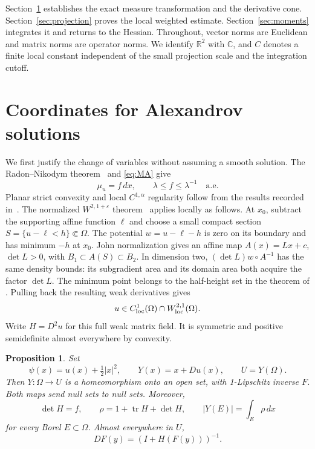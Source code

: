 \documentclass[11pt]{article}
\newtheorem{proposition}{Proposition}[section]
\theoremstyle{remark}
\numberwithin{equation}{section}
\newcommand{\R}{\mathbb R}
\newcommand{\C}{\mathbb C}
\newcommand{\tr}{\operatorname{tr}}
\begin{document}
Section~\ref{sec:coordinates} establishes the exact measure transformation
and the derivative cone. Section~\ref{sec:projection} proves the local weighted
estimate. Section~\ref{sec:moments} integrates it and returns to the Hessian.
Throughout, vector norms are Euclidean and matrix norms are operator norms.
We identify \(\R^2\) with \(\C\), and \(C\) denotes a finite local constant
independent of the small projection scale and the integration cutoff.

\section{Coordinates for Alexandrov solutions}\label{sec:coordinates}

We first justify the change of variables without assuming a smooth solution.
The Radon--Nikodym theorem~\cite[Theorem~2]{TaoRN} and
\eqref{eq:MA} give
\begin{equation}\label{eq:density}
\mu_u=f\,dx,\qquad \lambda\le f\le\lambda^{-1}\quad\text{a.e.}
\end{equation}
Planar strict convexity and local \(C^{1,\alpha}\) regularity follow from
the results recorded in~\cite[p.~18 and Theorem~2.14]{DPF}.
The normalized \(W^{2,1+\varepsilon}\) theorem~\cite[Theorem~1.1]{DFS}
applies locally as follows. At \(x_0\), subtract the supporting affine
function \(\ell\) and choose a small compact section
\(S=\{u-\ell<h\}\Subset\Omega\).
The potential \(w=u-\ell-h\) is zero on its boundary and has minimum \(-h\)
at \(x_0\). John normalization
\cite[Lemma~2.15]{DPF} gives an affine map \(A(x)=Lx+c\), \(\det L>0\),
with \(B_1\subset A(S)\subset B_2\). In dimension two,
\((\det L)w\circ A^{-1}\) has the same density bounds: its subgradient area
and its domain area both acquire the factor \(\det L\).
The minimum point belongs to the half-height set in the theorem of
\cite{DFS}. Pulling back the resulting weak derivatives gives
\[
u\in C^1_{\rm loc}(\Omega)\cap W^{2,1}_{\rm loc}(\Omega).
\]
Write \(H=D^2u\) for this full weak matrix field. It is symmetric and
positive semidefinite almost everywhere by convexity.

\begin{proposition}\label{prop:measure}
Set
\[
\psi(x)=u(x)+\tfrac12|x|^2,\qquad
Y(x)=x+Du(x),\qquad U=Y(\Omega).
\]
Then \(Y:\Omega\to U\) is a homeomorphism onto an open set, with
1-Lipschitz inverse \(F\). Both maps send null sets to null sets. Moreover,
\begin{equation}\label{eq:transport}
\det H=f,\qquad
\rho=1+\tr H+\det H,\qquad
|Y(E)|=\int_E\rho\,dx
\end{equation}
for every Borel \(E\subset\Omega\). Almost everywhere in \(U\),
\begin{equation}\label{eq:inverse}
DF(y)=(I+H(F(y)))^{-1}.
\end{equation}
\end{proposition}
\end{document}
